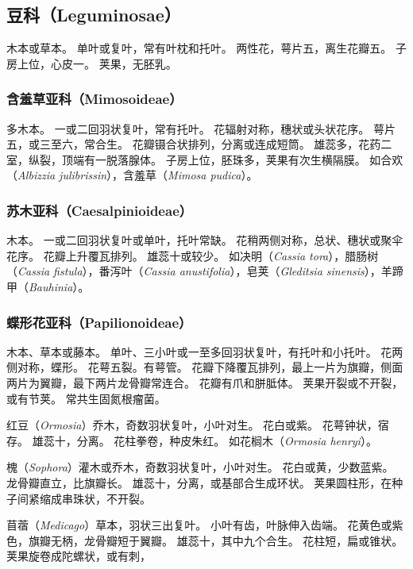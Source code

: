 \documentclass[11pt]{article}
\begin{document}
\begin{sloppypar}
\subsection{豆科（Leguminosae）}
木本或草本。
单叶或复叶，常有叶枕和托叶。
两性花，萼片五，离生花瓣五。
子房上位，心皮一。
荚果，无胚乳。

\subsubsection{含羞草亚科（Mimosoideae）}
多木本。
一或二回羽状复叶，常有托叶。
花辐射对称，穗状或头状花序。
萼片五，或三至六，常合生。
花瓣镊合状排列，分离或连成短筒。
雄蕊多，花药二室，纵裂，顶端有一脱落腺体。
子房上位，胚珠多，荚果有次生横隔膜。
如合欢（\textit{Albizzia julibrissin}），含羞草（\textit{Mimosa pudica}）。

\subsubsection{苏木亚科（Caesalpinioideae）}
木本。
一或二回羽状复叶或单叶，托叶常缺。
花稍两侧对称，总状、穗状或聚伞花序。
花瓣上升覆瓦排列。
雄蕊十或较少。
如决明（\textit{Cassia tora}），腊肠树（\textit{Cassia fistula}），番泻叶（\textit{Cassia anustifolia}），皂荚（\textit{Gleditsia sinensis}），羊蹄甲（\textit{Bauhinia}）。

\subsubsection{蝶形花亚科（Papilionoideae）}
木本、草本或藤本。
单叶、三小叶或一至多回羽状复叶，有托叶和小托叶。
花两侧对称，蝶形。
花萼五裂。有萼管。
花瓣下降覆瓦排列，最上一片为旗瓣，侧面两片为翼瓣，最下两片龙骨瓣常连合。
花瓣有爪和胼胝体。
荚果开裂或不开裂，或有节荚。
常共生固氮根瘤菌。

\par

红豆（\textit{Ormosia}）乔木，奇数羽状复叶，小叶对生。
花白或紫。
花萼钟状，宿存。
雄蕊十，分离。
花柱拳卷，种皮朱红。
如花榈木（\textit{Ormosia henryi}）。

\par

槐（\textit{Sophora}）灌木或乔木，奇数羽状复叶，小叶对生。
花白或黄，少数蓝紫。
龙骨瓣直立，比旗瓣长。
雄蕊十，分离，或基部合生成环状。
荚果圆柱形，在种子间紧缩成串珠状，不开裂。

\par

苜蓿（\textit{Medicago}）草本，羽状三出复叶。
小叶有齿，叶脉伸入齿端。
花黄色或紫色，旗瓣无柄，龙骨瓣短于翼瓣。
雄蕊十，其中九个合生。
花柱短，扁或锥状。
荚果旋卷成陀螺状，或有刺，


\end{sloppypar}
\end{document}
